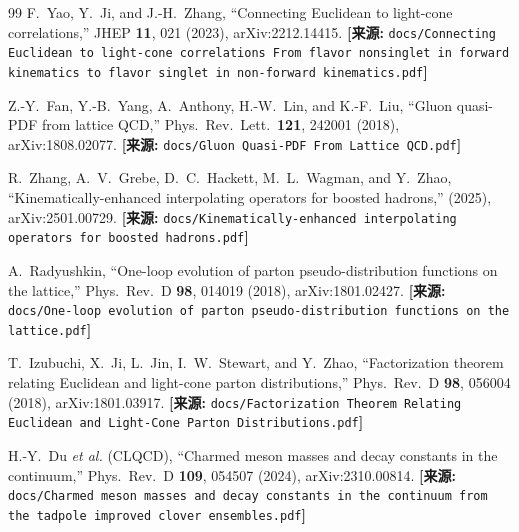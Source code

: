 \documentclass[12pt,a4paper]{ctexart}
\theoremstyle{definition}
\begin{document}
\begin{thebibliography}{99}
F.~Yao, Y.~Ji, and J.-H.~Zhang,
``Connecting Euclidean to light-cone correlations,''
JHEP \textbf{11}, 021 (2023), arXiv:2212.14415.
\quad\textbf{[来源:} \texttt{docs/Connecting Euclidean to light-cone correlations From flavor nonsinglet in forward kinematics to flavor singlet in non-forward kinematics.pdf}\textbf{]}

Z.-Y.~Fan, Y.-B.~Yang, A.~Anthony, H.-W.~Lin, and K.-F.~Liu,
``Gluon quasi-PDF from lattice QCD,''
Phys.\ Rev.\ Lett.\ \textbf{121}, 242001 (2018), arXiv:1808.02077.
\quad\textbf{[来源:} \texttt{docs/Gluon Quasi-PDF From Lattice QCD.pdf}\textbf{]}

R.~Zhang, A.~V.~Grebe, D.~C.~Hackett, M.~L.~Wagman, and Y.~Zhao,
``Kinematically-enhanced interpolating operators for boosted hadrons,''
(2025), arXiv:2501.00729.
\quad\textbf{[来源:} \texttt{docs/Kinematically-enhanced interpolating operators for boosted hadrons.pdf}\textbf{]}

A.~Radyushkin,
``One-loop evolution of parton pseudo-distribution functions on the lattice,''
Phys.\ Rev.\ D \textbf{98}, 014019 (2018), arXiv:1801.02427.
\quad\textbf{[来源:} \texttt{docs/One-loop evolution of parton pseudo-distribution functions on the lattice.pdf}\textbf{]}

T.~Izubuchi, X.~Ji, L.~Jin, I.~W.~Stewart, and Y.~Zhao,
``Factorization theorem relating Euclidean and light-cone parton distributions,''
Phys.\ Rev.\ D \textbf{98}, 056004 (2018), arXiv:1801.03917.
\quad\textbf{[来源:} \texttt{docs/Factorization Theorem Relating Euclidean and Light-Cone Parton Distributions.pdf}\textbf{]}

H.-Y.~Du \textit{et al.} (CLQCD),
``Charmed meson masses and decay constants in the continuum,''
Phys.\ Rev.\ D \textbf{109}, 054507 (2024), arXiv:2310.00814.
\quad\textbf{[来源:} \texttt{docs/Charmed meson masses and decay constants in the continuum from the tadpole improved clover ensembles.pdf}\textbf{]}

\end{thebibliography}
\end{document}
